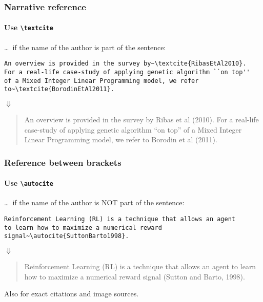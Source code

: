 \documentclass[aspectratio=169]{beamer}
\begin{document}
\begin{frame}
	\frametitle{Narrative reference}
	\framesubtitle{Use \texttt{\textbackslash{}textcite}}

  \ldots\ if the name of the author is part of the sentence:
  
\bigskip

\small
\begin{verbatim}
An overview is provided in the survey by~\textcite{RibasEtAl2010}.
For a real-life case-study of applying genetic algorithm ``on top''
of a Mixed Integer Linear Programming model, we refer
to~\textcite{BorodinEtAl2011}.
\end{verbatim}
\normalsize

\begin{center}
	$\Downarrow$
\end{center}

  \begin{quotation}
    An overview is provided in the survey by Ribas et al (2010). For a real-life case-study of applying genetic algorithm ``on top'' of a Mixed Integer Linear Programming model, we refer to Borodin et al (2011).
  \end{quotation}

\end{frame}

\begin{frame}[fragile]
	\frametitle{Reference between brackets}
	\framesubtitle{Use \texttt{\textbackslash{}autocite}}
	
	\ldots\ if the name of the author is NOT part of the sentence:
	
	\medskip
	
	\small
	\begin{verbatim}
Reinforcement Learning (RL) is a technique that allows an agent
to learn how to maximize a numerical reward
signal~\autocite{SuttonBarto1998}.
\end{verbatim}
	\normalsize
	
	\begin{center}
		$\Downarrow$
	\end{center}
	
	\begin{quotation}
		Reinforcement Learning (RL) is a technique that allows an agent to learn how to maximize a numerical reward signal (Sutton and Barto, 1998).
	\end{quotation}
	
	\bigskip
	
	Also for exact citations and image sources.
	
\end{frame}
\end{document}

